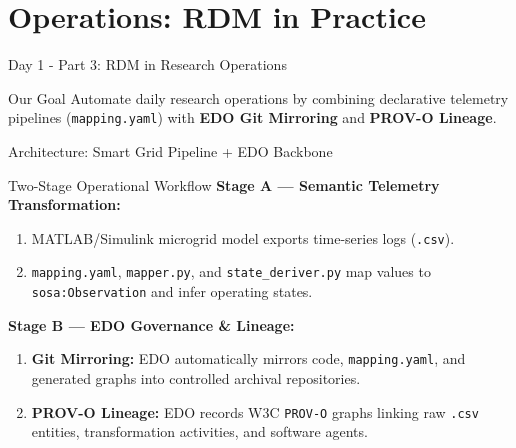 \documentclass[aspectratio=169]{beamer}
\let\pause\relax
\begin{document}
\section{Operations: RDM in Practice}

\begin{frame}{Day 1 - Part 3: RDM in Research Operations}
    \begin{block}{Our Goal}
        Automate daily research operations by combining declarative telemetry pipelines (\texttt{mapping.yaml}) with \textbf{EDO Git Mirroring} and \textbf{PROV-O Lineage}.
    \end{block}
\end{frame}

\begin{frame}{Architecture: Smart Grid Pipeline + EDO Backbone}
    \begin{block}{Two-Stage Operational Workflow}
        \textbf{Stage A — Semantic Telemetry Transformation:}
        \begin{enumerate}
            \item MATLAB/Simulink microgrid model exports time-series logs (\texttt{.csv}).
            \item \texttt{mapping.yaml}, \texttt{mapper.py}, and \texttt{state\_deriver.py} map values to \texttt{sosa:Observation} and infer operating states.
        \end{enumerate}
        \pause
        \textbf{Stage B — EDO Governance \& Lineage:}
        \begin{enumerate}
            \item \textbf{Git Mirroring:} EDO automatically mirrors code, \texttt{mapping.yaml}, and generated graphs into controlled archival repositories.
            \item \textbf{PROV-O Lineage:} EDO records W3C \texttt{PROV-O} graphs linking raw \texttt{.csv} entities, transformation activities, and software agents.
        \end{enumerate}
    \end{block}
\end{frame}
\end{document}
